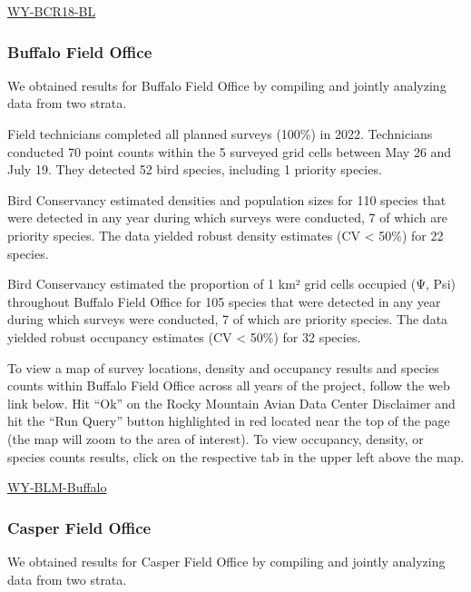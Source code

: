 \documentclass[
  letterpaper,
  DIV=11,
  numbers=noendperiod,
  oneside]{scrreprt}
\begin{document}
\href{http://www.rmbo.org/new_site/adc/QueryWindow.aspx\#N4IgzgLgTghhCuBbEAuABCA6gTQLQCEBhAJQEYAOAgGXX3igFMZ40B7AMzSpgDsATNAFleMAOYNEDHhBABfIA===}{WY-BCR18-BL}

\hypertarget{buffalo-field-office}{%
\subsubsection{Buffalo Field Office}\label{buffalo-field-office}}

We obtained results for Buffalo Field Office by compiling and jointly
analyzing data from two strata.

Field technicians completed all planned surveys (100\%) in 2022.
Technicians conducted 70 point counts within the 5 surveyed grid cells
between May 26 and July 19. They detected 52 bird species, including 1
priority species.

Bird Conservancy estimated densities and population sizes for 110
species that were detected in any year during which surveys were
conducted, 7 of which are priority species. The data yielded robust
density estimates (CV \textless{} 50\%) for 22 species.

Bird Conservancy estimated the proportion of 1 km² grid cells occupied
(Ψ, Psi) throughout Buffalo Field Office for 105 species that were
detected in any year during which surveys were conducted, 7 of which are
priority species. The data yielded robust occupancy estimates (CV
\textless{} 50\%) for 32 species.

To view a map of survey locations, density and occupancy results and
species counts within Buffalo Field Office across all years of the
project, follow the web link below. Hit ``Ok'' on the Rocky Mountain
Avian Data Center Disclaimer and hit the ``Run Query'' button
highlighted in red located near the top of the page (the map will zoom
to the area of interest). To view occupancy, density, or species counts
results, click on the respective tab in the upper left above the map.

\href{http://www.rmbo.org/new_site/adc/QueryWindow.aspx\#N4IgzgrgDgpgTmALnAhoiBbEAuABCAdQE0BaAIQBkBZciAMzpQBsB7EAXyA=}{WY-BLM-Buffalo}

\hypertarget{casper-field-office}{%
\subsubsection{Casper Field Office}\label{casper-field-office}}

We obtained results for Casper Field Office by compiling and jointly
analyzing data from two strata.
\end{document}
